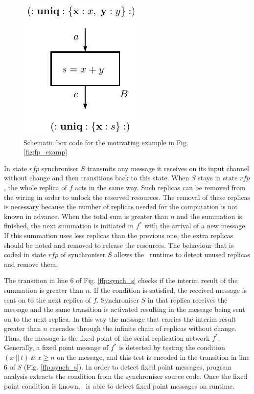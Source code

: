 \begin{figure}[h!]
\centering
\includegraphics[scale=0.8]{figs/chapter_04_fp_example_b.pdf}
\caption{Schematic box code for the motivating example in Fig. \ref{fig:fp_examp}}
\label{fig:fp_examp_b}
\end{figure}

In state $rfp$ synchroniser $S$ transmits any message it receives on its input channel without change and then transitions back to this state. When $S$ stays in state $rfp$, the whole replica of $f$ acts in the same way. Such replicas can be removed from the wiring in order to unlock the reserved resources. The removal of these replicas is necessary because the number of replicas needed for the computation is not known in advance. When the total sum is greater than $n$ and the summation is finished, the next summation is initiated in $f^{*}$ with the arrival of a new message. If this summation uses less replicas than the previous one, the extra replicas should be noted and removed to release the resources. The behaviour that is coded in state $rfp$ of synchroniser $S$ allows the \ak\ runtime to detect unused replicas and remove them.

The transition in line 6 of Fig. \ref{ffp:synch_s} checks if the interim result of the summation is greater than $n$. If the condition is satisfied, the received message is sent on to the next replica of $f$. Synchroniser $S$ in that replica receives the message and the same transition is activated resulting in the message being sent on to the next replica. In this way the message that carries the interim result greater than $n$ cascades through the infinite chain of replicas without change. Thus, the message is the fixed point of the serial replication network $f^{*}$. Generally, a fixed point message of $f^{*}$ is detected by testing the condition $(x \: || \:  t) \: \& \: x \ge n$ on the message, and this test is encoded in the transition in line 6 of $S$ (Fig. \ref{ffp:synch_s}). In order to detect fixed point messages, program analysis extracts the condition from the synchroniser source code. Once the fixed point condition is known, \ak\ is able to detect fixed point messages on runtime.

